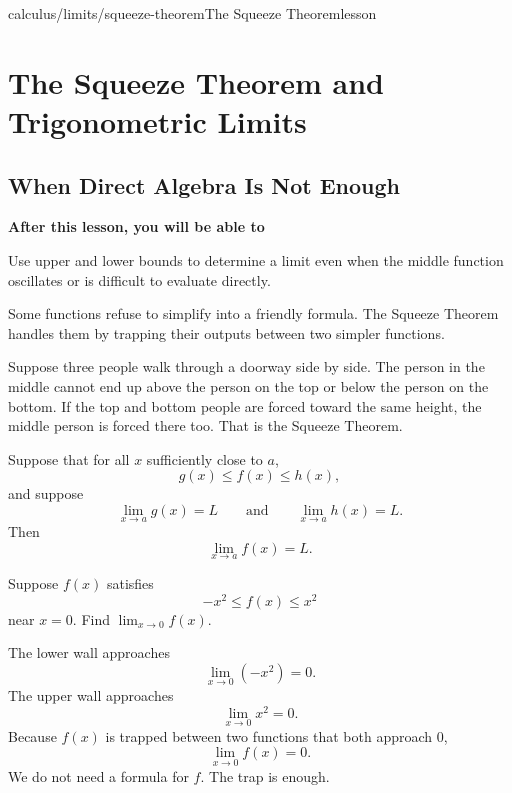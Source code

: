 \documentclass[11pt,openany]{book}
\theoremstyle{bgplain}
\newcommand{\lessonobjective}[1]{%
  \par\Needspace{4\baselineskip}\addvspace{0.6em}%
  {\bfseries\color{BGInk}After this lesson, you will be able to}\par\smallskip
  #1\par\addvspace{0.5em}%
}
\begin{document}
\begin{webpage}{calculus/limits/squeeze-theorem}{The Squeeze Theorem}{lesson}
\chapter{The Squeeze Theorem and Trigonometric Limits}

\section{When Direct Algebra Is Not Enough}

\lessonobjective{
Use upper and lower bounds to determine a limit even when the middle function oscillates or is difficult to evaluate directly.
}

Some functions refuse to simplify into a friendly formula. The Squeeze Theorem handles them by trapping their outputs between two simpler functions.

\begin{bgconcept}
Suppose three people walk through a doorway side by side. The person in the middle cannot end up above the person on the top or below the person on the bottom. If the top and bottom people are forced toward the same height, the middle person is forced there too. That is the Squeeze Theorem.
\end{bgconcept}

\begin{bgtheorem}[title={Squeeze Theorem}]
Suppose that for all \(x\) sufficiently close to \(a\),
\[
  g(x)\le f(x)\le h(x),
\]
and suppose
\[
  \lim_{x\to a}g(x)=L
  \qquad\text{and}\qquad
  \lim_{x\to a}h(x)=L.
\]
Then
\[
  \boxed{\lim_{x\to a}f(x)=L}.
\]
\end{bgtheorem}

\begin{bgguided}[title={A number trapped between shrinking walls}]
Suppose \(f(x)\) satisfies
\[
  -x^2\le f(x)\le x^2
\]
near \(x=0\). Find \(\lim_{x\to0}f(x)\).

\begin{bgsolution}
The lower wall approaches
\[
  \lim_{x\to0}(-x^2)=0.
\]
The upper wall approaches
\[
  \lim_{x\to0}x^2=0.
\]
Because \(f(x)\) is trapped between two functions that both approach \(0\),
\[
  \boxed{\lim_{x\to0}f(x)=0}.
\]
We do not need a formula for \(f\). The trap is enough.
\end{bgsolution}
\end{bgguided}



\end{webpage}
\end{document}
